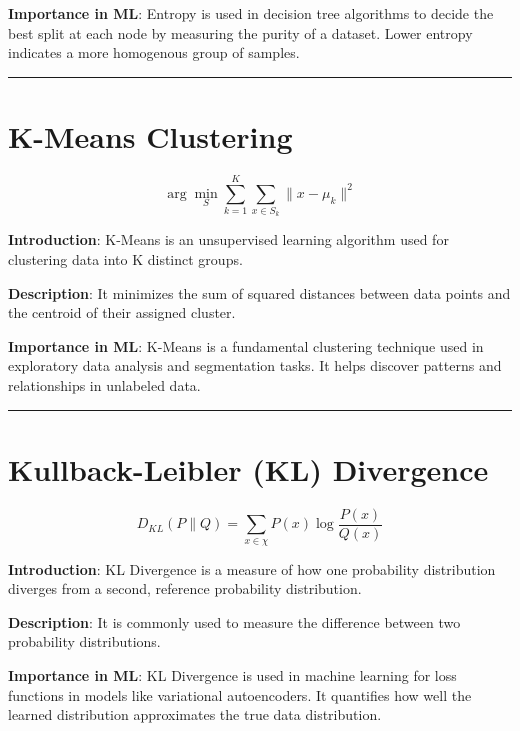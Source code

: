 \documentclass[
  12 pt,
  a4paper,
]{book}
\numberwithin{equation}{section}
\theoremstyle{plain}      %
\theoremstyle{definition} %
\theoremstyle{remark}     %
\theoremstyle{note}         %
\begin{document}
\textbf{Importance in ML}: Entropy is used in decision tree algorithms
to decide the best split at each node by measuring the purity of a
dataset. Lower entropy indicates a more homogenous group of samples.

\begin{center}\rule{0.5\linewidth}{0.5pt}\end{center}

\newpage

\hypertarget{k-means-clustering}{%
\chapter{K-Means Clustering}\label{k-means-clustering}}

\[
\arg\min_S \sum_{k=1}^K \sum_{x \in S_k} \|x - \mu_k\|^2
\]

\textbf{Introduction}: K-Means is an unsupervised learning algorithm
used for clustering data into K distinct groups.

\textbf{Description}: It minimizes the sum of squared distances between
data points and the centroid of their assigned cluster.

\textbf{Importance in ML}: K-Means is a fundamental clustering technique
used in exploratory data analysis and segmentation tasks. It helps
discover patterns and relationships in unlabeled data.

\begin{center}\rule{0.5\linewidth}{0.5pt}\end{center}

\newpage

\hypertarget{kullback-leibler-kl-divergence}{%
\chapter{Kullback-Leibler (KL)
Divergence}\label{kullback-leibler-kl-divergence}}

\[
D_{KL}(P \| Q) = \sum_{x \in \chi} P(x) \log \frac{P(x)}{Q(x)}
\]

\textbf{Introduction}: KL Divergence is a measure of how one probability
distribution diverges from a second, reference probability distribution.

\textbf{Description}: It is commonly used to measure the difference
between two probability distributions.

\textbf{Importance in ML}: KL Divergence is used in machine learning for
loss functions in models like variational autoencoders. It quantifies
how well the learned distribution approximates the true data
distribution.
\end{document}
